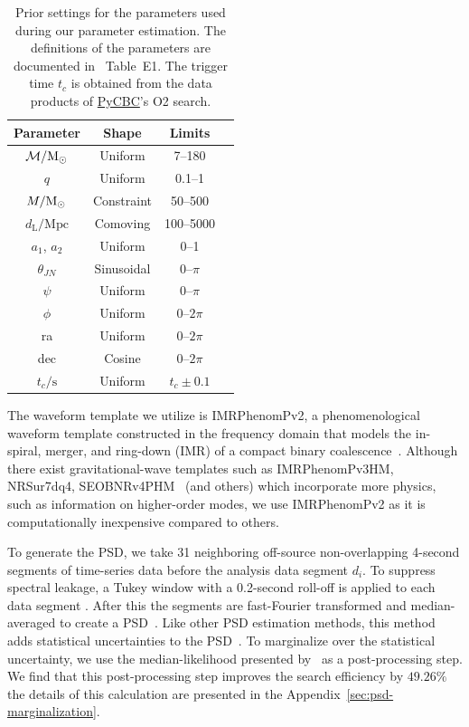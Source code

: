 \documentclass[%
 nofootinbib,
 amsmath,amssymb,
 aps,
 twocolumn,
 superscriptaddress
]{revtex4-2}
\newcommand{\imrphenomp}{{\sc IMRPhenomPv2}\xspace}
\newcommand{\seob}{{\sc SEOBNRv4PHM}\xspace}
\newcommand{\pycbc}{{\sc \href{https://pycbc.org/}{{PyCBC}}}\xspace}
\newcommand{\mathcmd}[1]{{\sc \relax\ifmmode#1\else $#1$\fi}\xspace}
\newcommand{\msun}{\mathcmd{\text{M}_\odot}}
\begin{document}
\begin{table}
    \centering
    \caption{
    Prior settings for the parameters used during our parameter estimation. The definitions of the parameters are documented in \citet{bilby_gwtc}~Table~E1. The trigger time $t_c$ is obtained from the data products of \pycbc's O2 search. \label{tab:priors}} 
    \begin{tabular}{c c c c}
    \hline
    Parameter & Shape & Limits \\
    \hline
          $\mathcal{M}/\msun$           & Uniform & 7--180  \\
          $q$                           & Uniform & 0.1--1  \\
          $M/\msun$                     & Constraint & 50--500  \\
          $d_\mathrm{L}/\mathrm{Mpc}$   & Comoving & 100--5000  \\
          $a_1$, $a_2$                  & Uniform & 0--1  \\
          $\theta_{JN}$                 & Sinusoidal & 0--$\pi$  \\
          $\psi$                        & Uniform & 0--$\pi$  \\
          $\phi$                        & Uniform & 0--$2\pi$  \\
          ra                            & Uniform & 0--$2\pi$  \\
          dec                           & Cosine & 0--$2\pi$  \\
          $t_c/\mathrm{s}$              & Uniform & $t_c\pm0.1$  \\
    \hline
    \end{tabular}
\end{table}

The waveform template we utilize is \imrphenomp, a phenomenological waveform template constructed in the frequency domain that models the in-spiral, merger, and ring-down (IMR) of a compact binary coalescence~\citep{khan2016frequency}. Although there exist gravitational-wave templates such as IMRPhenomPv3HM, NRSur7dq4, \seob~\cite{seobnrv4phm} (and others) which incorporate more physics, such as information on higher-order modes, we use \imrphenomp as it is computationally inexpensive compared to others.

To generate the PSD, we take 31 neighboring off-source non-overlapping  4-second  segments of time-series data before the analysis data segment $d_i$. To suppress spectral leakage, a Tukey window with a 0.2-second roll-off is applied to each data segment . After this the segments are fast-Fourier transformed and median-averaged to create a PSD~\cite{ligo_psd}. Like other PSD estimation methods, this method adds statistical uncertainties to the PSD~\cite{psd_student_t, chatziioannou2019noise, Biscoveanu:2020:PhRvD}. To marginalize over the statistical uncertainty, we use the median-likelihood presented by~\citet{psd_student_t} as a post-processing step. We find that this post-processing step improves the search efficiency by $49.26\%$ the details of this calculation are presented in the Appendix~\ref{sec:psd-marginalization}.
\end{document}
